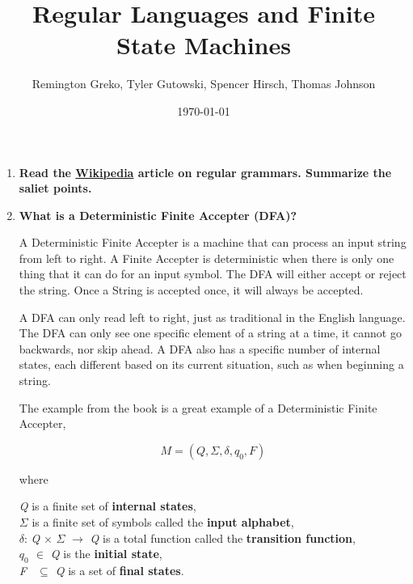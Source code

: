 \documentclass{article}
\begin{document}
\title{Regular Languages and Finite State Machines}
\author{Remington Greko, Tyler Gutowski, Spencer Hirsch, Thomas Johnson}
\date{\today}

\maketitle

\begin{enumerate}
    \item \textbf{Read the \href{https://en.wikipedia.org/wiki/Regular_grammar}{Wikipedia} article on regular grammars. Summarize
            the saliet points.}

    \medskip


    \medskip

    \item \textbf{What is a Deterministic Finite Accepter (DFA)?}
    
    \medskip

    \-\hspace{0.5cm} A Deterministic Finite Accepter is a machine that can process an input
    string from left to right. A Finite Accepter is deterministic when there is only one thing
    that it can do for an input symbol. The DFA will either accept or reject the string. Once
    a String is accepted once, it will always be accepted. 

    \-\hspace{0.5cm} A DFA can only read left to right, just as traditional in the English
    language. The DFA can only see one specific element of a string at a time, it cannot go 
    backwards, nor skip ahead. A DFA also has a specific number of internal states, each
    different based on its current situation, such as when beginning a string. 

    \-\hspace{0.5cm} The example from the book is a great example of a Deterministic Finite Accepter,
    
    \[M = (Q, \Sigma, \delta, q_0, F)\]

    where

    \smallskip

    \-\hspace{0.5cm} \textit{Q} is a finite set of \textbf{internal states}, \\
    \-\hspace{0.5cm} $\Sigma$ is a finite set of symbols called the \textbf{input alphabet}, \\
    \-\hspace{0.5cm} $\delta$: \textit{Q} $\times$ $\Sigma$ $\rightarrow$ \textit{Q} is a total function called the 
    \textbf{transition function}, \\
    \-\hspace{0.5cm} \textit{$q_0$ $\in$ Q} is the \textbf{initial state}, \\
    \-\hspace{0.5cm} \textit{F \ $\subseteq$ Q} is a set of \textbf{final states}.




\end{enumerate}
\end{document}
